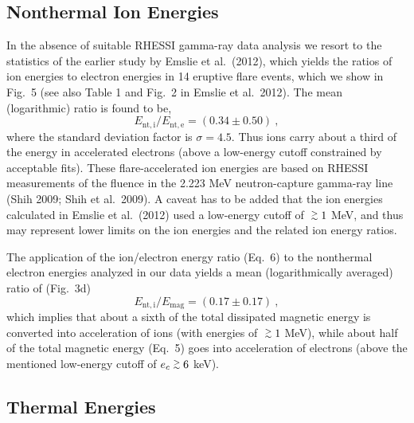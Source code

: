 \documentclass[10pt,preprint]{aastex}  %
\def\gapprox{\lower.4ex\hbox{$\;\buildrel >\over{\scriptstyle\sim}\;$}}
\begin{document}
\subsection{		Nonthermal Ion Energies			}

In the absence of suitable RHESSI gamma-ray data analysis we resort 
to the statistics of the earlier study by Emslie et al.~(2012), which
yields the ratios of ion energies to electron energies in
14 eruptive flare events, which we show in Fig.~5 (see also 
Table 1 and Fig.~2 in Emslie et al.~2012). The mean (logarithmic)
ratio is found to be,
\begin{equation}
	E_{\mathrm{nt,i}}/E_{\mathrm{nt,e}} = (0.34 \pm 0.50) \ ,
\end{equation}
where the standard deviation factor is $\sigma=4.5$.
Thus ions carry about a third of the energy in accelerated 
electrons (above a low-energy cutoff constrained by acceptable fits).
These flare-accelerated ion energies are
based on RHESSI measurements of the fluence in the 2.223 MeV
neutron-capture gamma-ray line (Shih 2009; Shih et al.~2009).
A caveat has to be added that the ion energies calculated in
Emslie et al.~(2012) used a low-energy cutoff of $\gapprox 1$ MeV,
and thus may represent lower limits on the ion energies and the
related ion energy ratios.

The application of the ion/electron energy ratio (Eq.~6)
to the nonthermal electron energies analyzed in our data yields
a mean (logarithmically averaged) ratio of (Fig.~3d)
\begin{equation}
	E_{\mathrm{nt,i}} / E_{\mathrm{mag}} = (0.17 \pm 0.17) \ ,
\end{equation}
which implies that about a sixth of the total dissipated magnetic
energy is converted into acceleration of ions (with energies
of $\gapprox 1$ MeV), while about half of the total magnetic energy 
(Eq.~5) goes into acceleration of electrons (above the mentioned 
low-energy cutoff of $e_c \gapprox 6$ keV).

\subsection{		Thermal Energies			}
\end{document}
